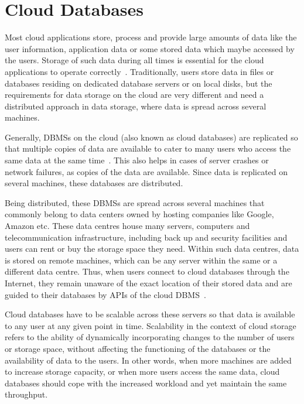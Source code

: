 \section{Cloud Databases}\label{s:cloud-databases}

Most cloud applications store,   process and provide large amounts of data like
the user information,   application data or some stored data which maybe
accessed by the users.   Storage of such data during all times is essential for
the cloud applications to operate correctly~\citep{Kennedy}.
Traditionally, users store data in files or databases residing on dedicated
database servers or on local disks, but the requirements for data storage on the
cloud are very different and need a distributed approach in data storage, where
data is spread across several machines. 

Generally, \acp{DBMS} on the cloud (also known as cloud databases) are
replicated so that multiple copies of data are available to cater to many users
who access the same data at the same time~\citep{Cooper}.   This also helps in
cases of server crashes or network failures,   as copies of the data are
available. Since data is replicated on several machines, these databases are
distributed.

Being distributed, these \acp{DBMS} are spread across several machines that
commonly belong to data centers owned by hosting companies like Google, Amazon
etc. These  data centres house many servers, computers and telecommunication
infrastructure,   including back up and security facilities and users can rent
or buy the storage space they need.   Within such data centres, data is stored
on remote machines,   which can be any server within the same or a different
data centre.   Thus, when users connect to cloud databases through the Internet,
  they remain unaware of the exact location of their stored data and are guided
to their databases by \acp{API} of the cloud \ac{DBMS}~\citep{Wuetal}.

Cloud databases have to be scalable across these servers so that data is
available to any user at any given point in time.   Scalability in the context of
cloud storage refers to the ability of dynamically incorporating changes to the
number of users or storage space,   without affecting the functioning of the
databases or the availability of data to the users.   In other words,   when more
machines are added to increase storage capacity,   or when more users access the
same data,   cloud databases should cope with the increased workload and yet
maintain the same throughput. 

